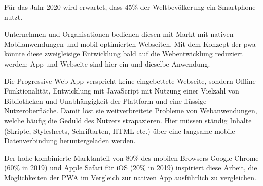 Für das Jahr 2020 wird erwartet, dass 45\% der Weltbevölkerung ein Smartphone nutzt.
\cite{StatistaSmartphonesWorldwide}
\cite{StatistaWorldPopulation}

Unternehmen und Organisationen bedienen diesen mit Markt mit nativen Mobilanwendungen und mobil-optimierten Webseiten.
Mit dem Konzept der \ac{pwa} könnte diese zweigleisige Entwicklung bald auf die Webentwicklung reduziert werden: App und Webseite sind hier ein und dieselbe Anwendung. 


Die Progressive Web App verspricht keine eingebettete Webseite, sondern Offline-Funktionalität, Entwicklung mit JavaScript mit Nutzung einer Vielzahl von Bibliotheken und Unabhängigkeit der Plattform und eine flüssige Nutzeroberfläche. Damit löst sie weitverbreitete Probleme von Webanwendungen, welche häufig die Geduld des Nutzers strapazieren. Hier müssen ständig Inhalte (Skripte, Stylesheets, Schriftarten, HTML etc.) über eine langsame mobile Datenverbindung heruntergeladen werden.

Der hohe kombinierte Marktanteil von 80\% des mobilen Browsers Google Chrome (60\% in 2019) und Apple Safari für iOS (20\% in 2019) inspiriert diese Arbeit, die Möglichkeiten der PWA im Vergleich zur nativen App ausführlich zu vergleichen. 
\cite{StatistaMobileBrowserMarketShare}

